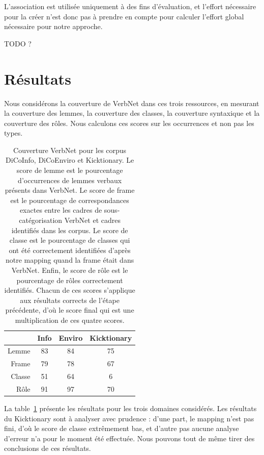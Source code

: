 L'association est utilisée uniquement à des fins d'évaluation, et l'effort
nécessaire pour la créer n'est donc pas à prendre en compte pour calculer
l'effort global nécessaire pour notre approche.

TODO ?

\section{Résultats}
\label{sec:domainsrlresults}

Nous considérons la couverture de VerbNet dans ces trois ressources, en
mesurant la couverture des lemmes, la couverture des classes, la couverture
syntaxique et la couverture des rôles. Nous calculons ces scores sur les
occurrences et non pas les types.

\begin{table}[h]
\centering
\begin{tabular}{rccc}
  \toprule
         & Info & Enviro & Kicktionary \\
  \midrule
  Lemme  & 83 & 84 & 75 \\
  Frame  & 79 & 78 & 67 \\
  Classe & 51 & 64 & 6  \\
  Rôle   & 91 & 97 & 70 \\
  \bottomrule
\end{tabular}

\caption{\label{table:coverage} Couverture VerbNet pour les corpus DiCoInfo,
    DiCoEnviro et Kicktionary. Le score de lemme est le pourcentage
    d'occurrences de lemmes verbaux présents dans VerbNet. Le score de frame
    est le pourcentage de correspondances exactes entre les cadres de
    sous-catégorisation VerbNet et cadres identifiés dans les corpus. Le score
    de classe est le pourcentage de classes qui ont été correctement
    identifiées d'après notre mapping quand la frame était dans VerbNet. Enfin,
    le score de rôle est le pourcentage de rôles correctement identifiés.
    Chacun de ces scores s'applique aux résultats corrects de l'étape
    précédente, d'où le score final qui est une multiplication de ces quatre
    scores.}

\end{table}

La table~\ref{table:coverage} présente les résultats pour les trois domaines
considérés. Les résultats du Kicktionary sont à analyser avec prudence : d'une
part, le mapping n'est pas fini, d'où le score de classe extrêmement bas, et
d'autre pas aucune analyse d'erreur n'a pour le moment été effectuée. Nous
pouvons tout de même tirer des conclusions de ces résultats.

